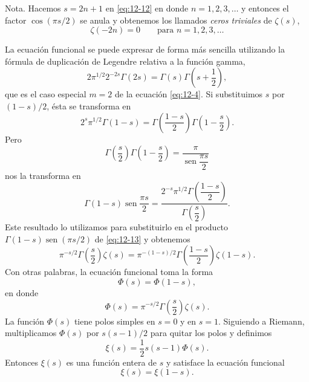 \documentclass[12pt,a4paper]{book}
\begin{document}
    Nota. Hacemos $s=2n+1$ en \eqref{eq:12-12} en donde $n=1,2,3,\dots$ y entonces el factor
    $\cos(\pi s/2)$ se anula y obtenemos los llamados \textit{ceros triviales} de $\zeta(s)$,
    \begin{equation*}
        \zeta(-2n)=0\qquad\text{para }n=1,2,3,\dots
    \end{equation*}

    La ecuación funcional se puede expresar de forma más sencilla utilizando la fórmula de
    duplicación de Legendre relativa a la función gamma,
    \begin{equation*}
        2\pi^{1/2}2^{-2s}\Gamma(2s)=\Gamma(s)\Gamma\left(s+\frac{1}{2}\right),
    \end{equation*}
    que es el caso especial $m=2$ de la ecuación \eqref{eq:12-4}. Si substituimos $s$ por
    $(1-s)/2$, ésta se transforma en
    \begin{equation*}
        2^{s}\pi^{1/2}\Gamma(1-s)=\Gamma\left(\frac{1-s}{2}\right)\Gamma\left(1-\frac{s}{2}\right).
    \end{equation*}
    Pero
    \begin{equation*}
        \Gamma\left(\frac{s}{2}\right)\Gamma\left(1-\frac{s}{2}\right)=\frac{\pi}{\operatorname{sen}\dfrac{\pi s}{2}}
    \end{equation*}
    nos la transforma en
    \begin{equation*}
        \Gamma(1-s)\operatorname{sen}\frac{\pi s}{2}=\frac{2^{-s}\pi^{1/2}\Gamma\left(\dfrac{1-s}{2}\right)}{\Gamma\left(\dfrac{s}{2}\right)}.
    \end{equation*}
    Este resultado lo utilizamos para substituirlo en el producto $\Gamma(1-s)\operatorname{sen}(\pi s/2)$
    de \eqref{eq:12-13} y obtenemos
    \begin{equation*}
        \pi^{-s/2}\Gamma\left(\frac{s}{2}\right)\zeta(s)=\pi^{-(1-s)/2}\Gamma\left(\frac{1-s}{2}\right)\zeta(1-s).
    \end{equation*}
    Con otras palabras, la ecuación funcional toma la forma
    \begin{equation*}
        \Phi(s)=\Phi(1-s),
    \end{equation*}
    en donde
    \begin{equation*}
        \Phi(s)=\pi^{-s/2}\Gamma\left(\frac{s}{2}\right)\zeta(s).
    \end{equation*}
    La función $\Phi(s)$ tiene polos simples en $s=0$ y en $s=1$. Siguiendo a Riemann,
    multiplicamos $\Phi(s)$ por $s(s-1)/2$ para quitar los polos y definimos
    \begin{equation*}
        \xi(s)=\frac{1}{2}s(s-1)\Phi(s).
    \end{equation*}
    Entonces $\xi(s)$ es una función entera de $s$ y satisface la ecuación funcional
    \begin{equation*}
        \xi(s)=\xi(1-s).
    \end{equation*}
\end{document}

